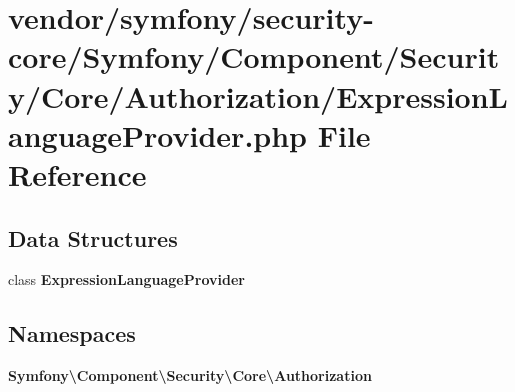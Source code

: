 \section{vendor/symfony/security-\/core/\+Symfony/\+Component/\+Security/\+Core/\+Authorization/\+Expression\+Language\+Provider.php File Reference}
\label{_expression_language_provider_8php}
\subsection*{Data Structures}
\begin{DoxyCompactItemize}
\item 
class {\bf Expression\+Language\+Provider}
\end{DoxyCompactItemize}
\subsection*{Namespaces}
\begin{DoxyCompactItemize}
\item 
 {\bf Symfony\textbackslash{}\+Component\textbackslash{}\+Security\textbackslash{}\+Core\textbackslash{}\+Authorization}
\end{DoxyCompactItemize}
